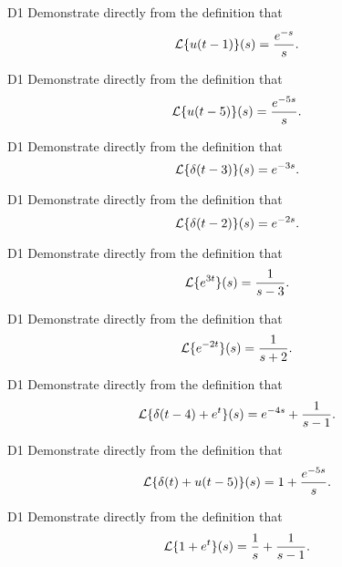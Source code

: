 \begin{problem}{D1}
Demonstrate directly from the definition that \[\mathcal{L}\{u(t-1)\}(s)=\frac{e^{-s}}{s}.\]
\end{problem}

\begin{problem}{D1}
Demonstrate directly from the definition that \[\mathcal{L}\{u(t-5)\}(s)=\frac{e^{-5s}}{s}.\]
\end{problem}

\begin{problem}{D1}
Demonstrate directly from the definition that \[\mathcal{L}\{\delta(t-3)\}(s)=e^{-3s}.\]
\end{problem}

\begin{problem}{D1}
Demonstrate directly from the definition that \[\mathcal{L}\{\delta(t-2)\}(s)=e^{-2s}.\]
\end{problem}

\begin{problem}{D1}
Demonstrate directly from the definition that \[\mathcal{L}\{e^{3t}\}(s)=\frac{1}{s-3}.\]
\end{problem}

\begin{problem}{D1}
Demonstrate directly from the definition that \[\mathcal{L}\{e^{-2t}\}(s)=\frac{1}{s+2}.\]
\end{problem}

\begin{problem}{D1}
Demonstrate directly from the definition that \[\mathcal{L}\{\delta(t-4)+e^t\}(s)=e^{-4s}+\frac{1}{s-1}.\]
\end{problem}

\begin{problem}{D1}
Demonstrate directly from the definition that \[\mathcal{L}\{\delta(t)+u(t-5)\}(s)=1+\frac{e^{-5s}}{s}.\]
\end{problem}

\begin{problem}{D1}
Demonstrate directly from the definition that \[\mathcal{L}\{1+e^{t}\}(s)=\frac{1}{s}+\frac{1}{s-1}.\]
\end{problem}
